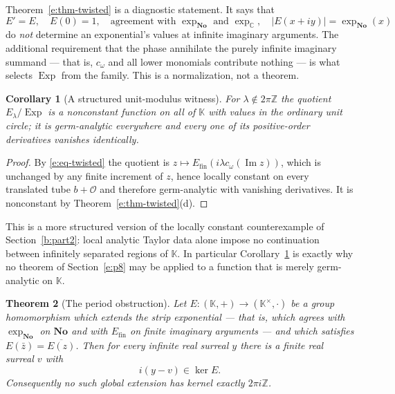 \documentclass[11pt,a4paper]{article}
\numberwithin{equation}{section}
\newtheorem{theorem}{Theorem}[section]
\newtheorem{corollary}[theorem]{Corollary}
\theoremstyle{definition}
\theoremstyle{remark}
\theoremstyle{plain}
\newcommand{\K}{\mathbb K}
\newcommand{\No}{\mathbf{No}}
\newcommand{\CC}{\mathbb C}
\newcommand{\ZZ}{\mathbb Z}
\newcommand{\Ov}{\mathcal O}
\DeclareMathOperator{\Exp}{Exp}
\newcommand{\abs}[1]{\lvert #1\rvert}
\begin{document}
Theorem~\ref{e:thm-twisted} is a diagnostic statement.  It says that
\[
 E'=E,\quad E(0)=1,\quad
 \text{agreement with }\exp_{\No}\text{ and }\exp_{\CC},\quad
 \abs{E(x+iy)}=\exp_{\No}(x)
\]
do \emph{not} determine an exponential's values at infinite imaginary
arguments.  The additional requirement that the phase annihilate the
purely infinite imaginary summand --- that is,
$c_\omega$ and all lower monomials contribute nothing --- is what selects
$\Exp$ from the family.  This is a normalization, not a theorem.

\begin{corollary}[A structured unit-modulus witness]\label{e:cor-twistwitness}
For $\lambda\notin2\pi\ZZ$ the quotient $E_\lambda/\Exp$ is a nonconstant
function on all of $\K$ with values in the ordinary unit circle; it is
germ-analytic everywhere and every one of its positive-order derivatives
vanishes identically.
\end{corollary}

\begin{proof}
By \eqref{e:eq-twisted} the quotient is
$z\mapsto E_{\mathrm{fin}}(i\lambda c_\omega(\operatorname{Im}z))$, which
is unchanged by any finite increment of $z$, hence locally constant on
every translated tube $b+\Ov$ and therefore germ-analytic with vanishing
derivatives.  It is nonconstant by
Theorem~\ref{e:thm-twisted}(d).
\end{proof}

This is a more structured version of the locally constant counterexample of
Section~\ref{b:part2}: local analytic Taylor data alone impose no continuation between
infinitely separated regions of $\K$.  In particular
Corollary~\ref{e:cor-twistwitness} is exactly why no theorem of Section~\ref{e:p8} may
be applied to a function that is merely germ-analytic on $\K$.

\begin{theorem}[The period obstruction]\label{e:thm-periodobstruction}
Let $E:(\K,+)\to(\K^{\times},\cdot)$ be a group homomorphism which
extends the strip exponential --- that is, which agrees with
$\exp_{\No}$ on $\No$ and with $E_{\mathrm{fin}}$ on finite imaginary
arguments --- and which satisfies $E(\bar z)=\overline{E(z)}$.  Then for
every \emph{infinite} real surreal $y$ there is a \emph{finite} real
surreal $v$ with
\begin{equation}\label{e:eq-periodobstruction}
 i(y-v)\in\ker E .
\end{equation}
Consequently no such global extension has kernel exactly $2\pi i\ZZ$.
\end{theorem}
\end{document}
